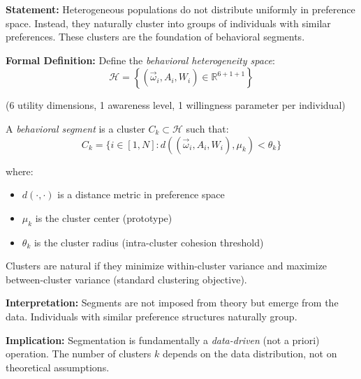 \begin{tcolorbox}[colback=gray!5!white, colframe=gray!75!black,
    title=Axiom SEG-EMERGE-2: Natural Clustering in Preference Space]

\textbf{Statement:}
Heterogeneous populations do not distribute uniformly in preference space. Instead,
they naturally cluster into groups of individuals with similar preferences. These
clusters are the foundation of behavioral segments.

\textbf{Formal Definition:}
Define the \textit{behavioral heterogeneity space}:
\begin{equation}
\mathcal{H} = \left\{ (\vec{\omega}_i, A_i, W_i) \in \mathbb{R}^{6 + 1 + 1} \right\}
\end{equation}

(6 utility dimensions, 1 awareness level, 1 willingness parameter per individual)

A \textit{behavioral segment} is a cluster $C_k \subset \mathcal{H}$ such that:
\begin{equation}
C_k = \{ i \in [1,N] : d((\vec{\omega}_i, A_i, W_i), \mu_k) < \theta_k \}
\end{equation}

where:
\begin{itemize}[nosep]
\item $d(\cdot, \cdot)$ is a distance metric in preference space
\item $\mu_k$ is the cluster center (prototype)
\item $\theta_k$ is the cluster radius (intra-cluster cohesion threshold)
\end{itemize}

Clusters are natural if they minimize within-cluster variance and maximize
between-cluster variance (standard clustering objective).

\textbf{Interpretation:}
Segments are not imposed from theory but emerge from the data. Individuals with
similar preference structures naturally group.

\textbf{Implication:}
Segmentation is fundamentally a \textit{data-driven} (not a priori) operation.
The number of clusters $k$ depends on the data distribution, not on theoretical
assumptions.

\end{tcolorbox}

\vspace{1em}

